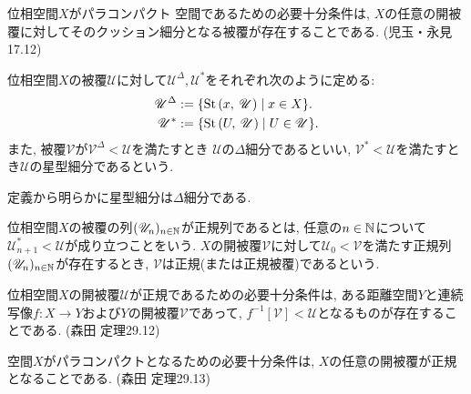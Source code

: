 \documentclass[uplatex, dvipdfmx, a4paper, 12pt, class=jsbook, crop=false]{standalone}
\begin{document}
\begin{proposition}
	位相空間$ X $がパラコンパクト  空間であるための必要十分条件は, 
	$ X $の任意の開被覆に対してそのクッション細分となる被覆が存在することである.
	(児玉・永見 17.12)
\end{proposition}

\begin{definition}
	位相空間$ X $の被覆$ \mathscr{U} $に対して$ \mathscr{U}^\Delta, \mathscr{U}^* $をそれぞれ次のように定める:
	\begin{align*}
		\mathscr{U}^\Delta & \defeq \setcomp{\starset{x}{\mathscr{U}}}{x \in X}. \\
		\mathscr{U}^* & \defeq \setcomp{\starset{U}{\mathscr{U}}}{U \in \mathscr{U}}.
	\end{align*}
	また, 被覆$ \mathscr{V} $が$ \mathscr{V}^\Delta < \mathscr{U} $を満たすとき
	$ \mathscr{U} $の$ \Delta $細分であるといい,
	$ \mathscr{V}^* < \mathscr{U} $を満たすとき$ \mathscr{U} $の星型細分であるという.
\end{definition}
定義から明らかに星型細分は$ \Delta $細分である.

\begin{definition}
	位相空間$ X $の被覆の列$ (\mathscr{U}_n)_{n \in \mathbb{N}} $が正規列であるとは,
	任意の$ n \in \mathbb{N}  $について$ \mathscr{U}_{n+1}^* < \mathscr{U} $が成り立つことをいう.
	$ X $の開被覆$ \mathscr{V} $に対して$ \mathscr{U}_0 < \mathscr{V} $を満たす正規列
	$ (\mathscr{U}_n)_{n \in \mathbb{N}} $が存在するとき, 
	$ \mathscr{V} $は正規(または正規被覆)であるという.
\end{definition}

\begin{proposition}
	位相空間$ X $の開被覆$ \mathscr{U} $が正規であるための必要十分条件は, 
	ある距離空間$ Y $と連続写像$ f \colon X \to Y $および$ Y $の開被覆$ \mathscr{V} $であって,
	$ f^{-1}[\mathscr{V}] < \mathscr{U} $となるものが存在することである.
	(森田 定理29.12)
\end{proposition}

\begin{theorem}
	 空間$ X $がパラコンパクトとなるための必要十分条件は, $ X $の任意の開被覆が正規となることである.
	(森田 定理29.13)
\end{theorem}
\end{document}
